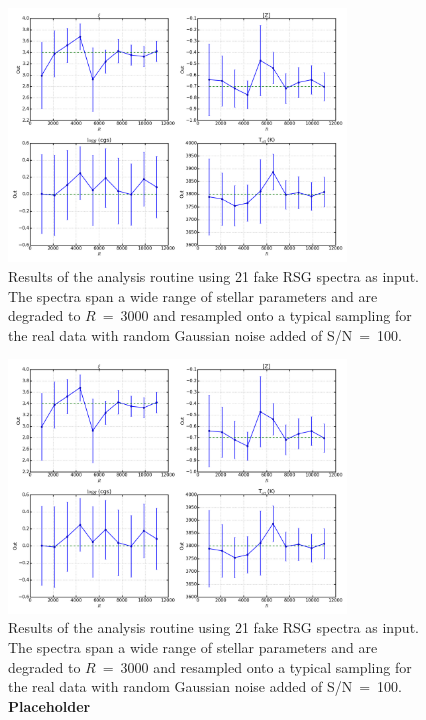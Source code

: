 \begin{figure}
 \centering
 \includegraphics[width=0.80\textwidth]{JAnal/Fakespec-tres-v1}
 \caption[Analysis test resolution]{
Results of the analysis routine using 21 fake RSG spectra as input.
The spectra span a wide range of stellar parameters and are degraded to $R~=~3000$ and resampled onto a typical sampling for the real data with random Gaussian noise added of S/N~=~100.
\label{fig:tres}
         }
\end{figure}

\begin{figure}
 \centering
 \includegraphics[width=0.80\textwidth]{JAnal/Fakespec-tres-v1}
 \caption[Analysis test S/N]{
Results of the analysis routine using 21 fake RSG spectra as input.
The spectra span a wide range of stellar parameters and are degraded to $R~=~3000$ and resampled onto a typical sampling for the real data with random Gaussian noise added of S/N~=~100.
\textbf{Placeholder}
\label{fig:tres}
         }
\end{figure}


